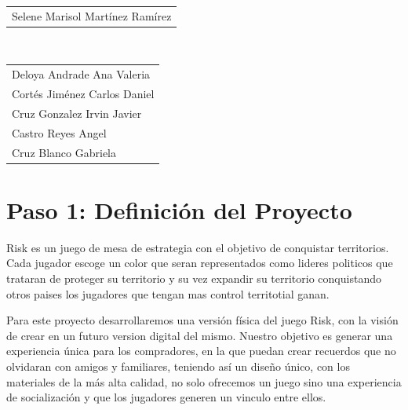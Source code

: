 \documentclass[12pt]{article}
\begin{document}
\begin{titlepage}
\begin{center}
\begin{tabular}{l}
\large Selene Marisol Martínez Ramírez \\[0.5cm]
\end{tabular}

\\[0.6cm]
\color{black}
\centering
\begin{tabular}{l}


\large Deloya Andrade Ana Valeria \\[0.4cm]

\large   Cortés Jiménez Carlos Daniel \\[0.4cm]

\large  Cruz Gonzalez Irvin Javier \\[0.4cm]

\large  Castro Reyes Angel  \\[0.4cm]

\large   Cruz Blanco Gabriela \\[0.4cm]
\end{tabular}

\vfill

\end{center}
\end{titlepage}

 \section*{Paso 1: Definición del Proyecto}

  Risk es un juego de mesa de estrategia con el objetivo de conquistar territorios. Cada jugador escoge un color que seran representados como lideres politicos que trataran de proteger su territorio y su vez expandir su territorio conquistando otros paises los jugadores que tengan mas control territotial ganan.

  Para este proyecto desarrollaremos una versión física del juego Risk, con la visión de crear en un futuro version digital del mismo. Nuestro objetivo es generar una experiencia única para los compradores, en la que puedan crear recuerdos que no olvidaran con amigos y familiares, teniendo así un diseño único, con los materiales de la más alta calidad, no solo ofrecemos un juego sino una experiencia de socialización y que los jugadores generen un vinculo entre ellos.
\end{document}

